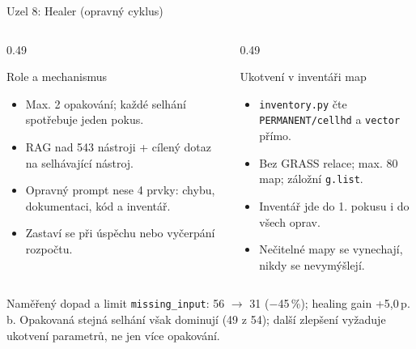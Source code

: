 \documentclass[aspectratio=169,10pt]{beamer}
\begin{document}
\begin{frame}[t]{Uzel 8: Healer (opravný cyklus)}
  \footnotesize
  \begin{columns}[T,onlytextwidth]
    \begin{column}{0.49\textwidth}
      \begin{block}{Role a mechanismus}
        \begin{itemize}
          \item Max. 2 opakování; každé selhání spotřebuje jeden pokus.
          \item RAG nad 543 nástroji + cílený dotaz na selhávající nástroj.
          \item Opravný prompt nese 4 prvky: chybu, dokumentaci, kód a inventář.
          \item Zastaví se při úspěchu nebo vyčerpání rozpočtu.
        \end{itemize}
      \end{block}
    \end{column}
    \begin{column}{0.49\textwidth}
      \begin{block}{Ukotvení v inventáři map}
        \begin{itemize}
          \item \texttt{inventory.py} čte \texttt{PERMANENT/cellhd} a
                \texttt{vector} přímo.
          \item Bez GRASS relace; max. 80 map; záložní \texttt{g.list}.
          \item Inventář jde do 1. pokusu i do všech oprav.
          \item Nečitelné mapy se vynechají, nikdy se nevymýšlejí.
        \end{itemize}
      \end{block}
    \end{column}
  \end{columns}

  \begin{alertblock}{Naměřený dopad a limit}
    \texttt{missing\_input}: 56 $\rightarrow$ 31 ($-$45\,\%); healing gain
    +5{,}0\,p.\,b. Opakovaná stejná selhání však dominují (49 z 54); další
    zlepšení vyžaduje ukotvení parametrů, ne jen více opakování.
  \end{alertblock}
\end{frame}

\end{document}

